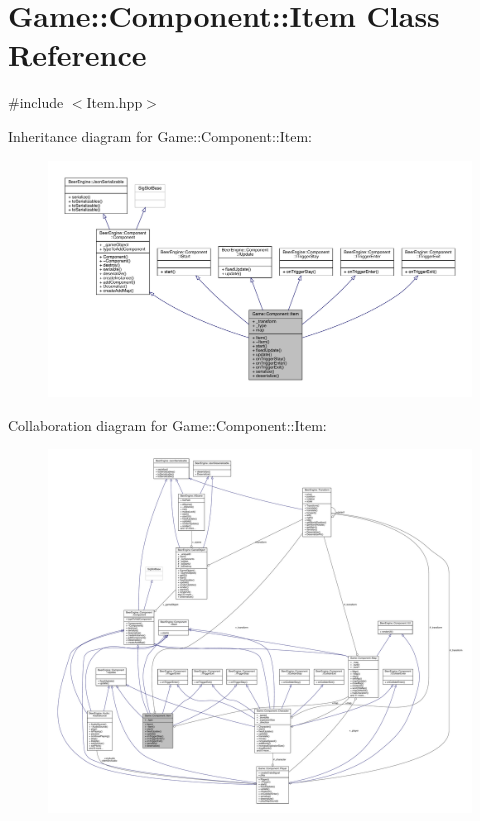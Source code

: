 \hypertarget{class_game_1_1_component_1_1_item}{}\section{Game\+:\+:Component\+:\+:Item Class Reference}
\label{class_game_1_1_component_1_1_item}


{\ttfamily \#include $<$Item.\+hpp$>$}



Inheritance diagram for Game\+:\+:Component\+:\+:Item\+:\nopagebreak
\begin{figure}[H]
\begin{center}
\leavevmode
\includegraphics[width=350pt]{class_game_1_1_component_1_1_item__inherit__graph}
\end{center}
\end{figure}


Collaboration diagram for Game\+:\+:Component\+:\+:Item\+:
\nopagebreak
\begin{figure}[H]
\begin{center}
\leavevmode
\includegraphics[width=350pt]{class_game_1_1_component_1_1_item__coll__graph}
\end{center}
\end{figure}
